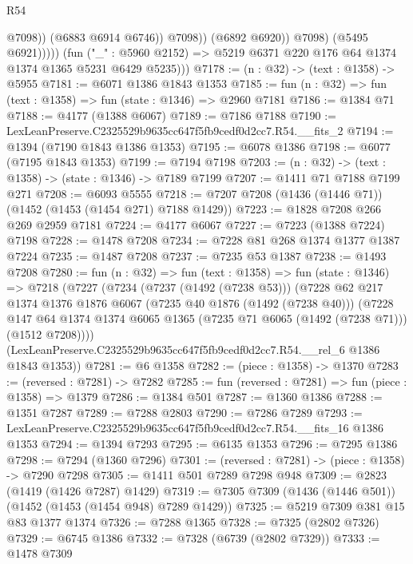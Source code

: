 \begin{lexlean}{R54}
\begin{coremodule}
                              @7098))
                          (@6883 @6914 @6746))
                        @7098))
                    (@6892 @6920))
                  @7098)
                (@5495 @6921)))))
        (fun ("_" : @5960 @2152) => @5219 @6371 @220 @176 @64 @1374 @1374 @1365 @5231 @6429 @5235)))
@7178 := (n : @32) -> (text : @1358) -> @5955
@7181 := @6071 @1386 @1843 @1353
@7185 := fun (n : @32) => fun (text : @1358) => fun (state : @1346) => @2960 @7181
@7186 := @1384 @71
@7188 := @4177 (@1388 @6067)
@7189 := @7186 @7188
@7190 := LexLeanPreserve.C2325529b9635cc647f5fb9cedf0d2cc7.R54.__fits_2
@7194 := @1394 (@7190 @1843 @1386 @1353)
@7195 := @6078 @1386
@7198 := @6077 (@7195 @1843 @1353)
@7199 := @7194 @7198
@7203 := (n : @32) -> (text : @1358) -> (state : @1346) -> @7189 @7199
@7207 := @1411 @71 @7188 @7199 @271
@7208 := @6093 @5555
@7218 := @7207 @7208 (@1436 (@1446 @71)) (@1452 (@1453 (@1454 @271) @7188 @1429))
@7223 := @1828 @7208 @266 @269 @2959 @7181
@7224 := @4177 @6067
@7227 := @7223 (@1388 @7224) @7198
@7228 := @1478 @7208
@7234 := @7228 @81 @268 @1374 @1377 @1387 @7224
@7235 := @1487 @7208
@7237 := @7235 @53 @1387
@7238 := @1493 @7208
@7280 := fun (n : @32) =>
  fun (text : @1358) =>
  fun (state : @1346) =>
  @7218
    (@7227
      (@7234
        (@7237 (@1492 (@7238 @53)))
        (@7228
          @62
          @217
          @1374
          @1376
          @1876
          @6067
          (@7235 @40 @1876 (@1492 (@7238 @40)))
          (@7228
            @147
            @64
            @1374
            @1374
            @6065
            @1365
            (@7235 @71 @6065 (@1492 (@7238 @71)))
            (@1512 @7208))))
      (LexLeanPreserve.C2325529b9635cc647f5fb9cedf0d2cc7.R54.__rel_6 @1386 @1843 @1353))
@7281 := @6 @1358
@7282 := (piece : @1358) -> @1370
@7283 := (reversed : @7281) -> @7282
@7285 := fun (reversed : @7281) => fun (piece : @1358) => @1379
@7286 := @1384 @501
@7287 := @1360 @1386
@7288 := @1351 @7287
@7289 := @7288 @2803
@7290 := @7286 @7289
@7293 := LexLeanPreserve.C2325529b9635cc647f5fb9cedf0d2cc7.R54.__fits_16 @1386 @1353
@7294 := @1394 @7293
@7295 := @6135 @1353
@7296 := @7295 @1386
@7298 := @7294 (@1360 @7296)
@7301 := (reversed : @7281) -> (piece : @1358) -> @7290 @7298
@7305 := @1411 @501 @7289 @7298 @948
@7309 := @2823 (@1419 (@1426 @7287) @1429)
@7319 := @7305 @7309 (@1436 (@1446 @501)) (@1452 (@1453 (@1454 @948) @7289 @1429))
@7325 := @5219 @7309 @381 @15 @83 @1377 @1374
@7326 := @7288 @1365
@7328 := @7325 (@2802 @7326)
@7329 := @6745 @1386
@7332 := @7328 (@6739 (@2802 @7329))
@7333 := @1478 @7309

\end{coremodule}
\end{lexlean}
